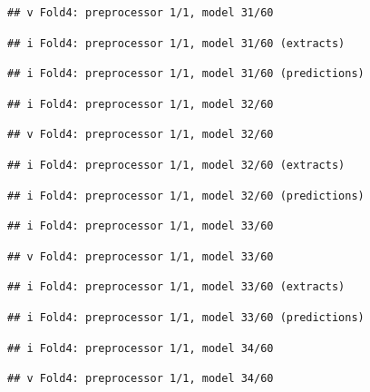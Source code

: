 \documentclass[
]{article}
\begin{document}
\begin{verbatim}
## v Fold4: preprocessor 1/1, model 31/60
\end{verbatim}

\begin{verbatim}
## i Fold4: preprocessor 1/1, model 31/60 (extracts)
\end{verbatim}

\begin{verbatim}
## i Fold4: preprocessor 1/1, model 31/60 (predictions)
\end{verbatim}

\begin{verbatim}
## i Fold4: preprocessor 1/1, model 32/60
\end{verbatim}

\begin{verbatim}
## v Fold4: preprocessor 1/1, model 32/60
\end{verbatim}

\begin{verbatim}
## i Fold4: preprocessor 1/1, model 32/60 (extracts)
\end{verbatim}

\begin{verbatim}
## i Fold4: preprocessor 1/1, model 32/60 (predictions)
\end{verbatim}

\begin{verbatim}
## i Fold4: preprocessor 1/1, model 33/60
\end{verbatim}

\begin{verbatim}
## v Fold4: preprocessor 1/1, model 33/60
\end{verbatim}

\begin{verbatim}
## i Fold4: preprocessor 1/1, model 33/60 (extracts)
\end{verbatim}

\begin{verbatim}
## i Fold4: preprocessor 1/1, model 33/60 (predictions)
\end{verbatim}

\begin{verbatim}
## i Fold4: preprocessor 1/1, model 34/60
\end{verbatim}

\begin{verbatim}
## v Fold4: preprocessor 1/1, model 34/60
\end{verbatim}
\end{document}
